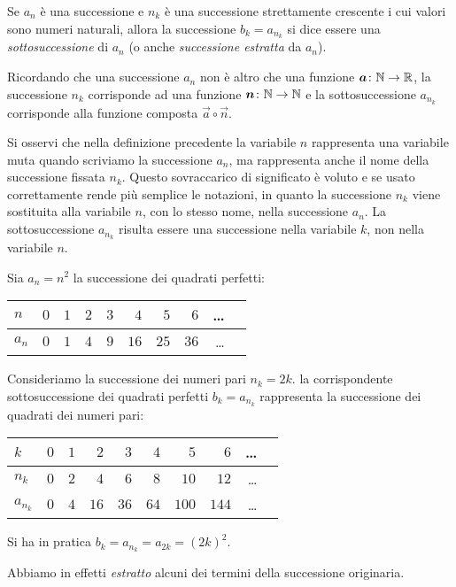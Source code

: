 \begin{definition}[sottosuccessione]
\mymark{*}
Se $a_n$ è una successione e $n_k$ è una successione strettamente crescente i cui valori sono numeri naturali, allora la successione
$b_k = a_{n_k}$ si dice essere una \emph{sottosuccessione}%
%
 di $a_n$
(o anche \emph{successione estratta} da $a_n$).
\end{definition}

Ricordando che una successione $a_n$ non è altro che una funzione
$\boldsymbol a\colon {\mathbb N} \to {\mathbb R}$, la successione $n_k$ corrisponde ad una funzione
$\boldsymbol n\colon {\mathbb N} \to {\mathbb N}$ e la sottosuccessione $a_{n_k}$ corrisponde alla
funzione composta $\vec a \circ \vec n$.

Si osservi che nella definizione precedente la variabile $n$ rappresenta
una variabile muta quando scriviamo la successione $a_n$, ma
rappresenta anche il nome della successione fissata $n_k$.
Questo sovraccarico
di significato è voluto e se usato correttamente rende più semplice
le notazioni, in quanto la successione $n_k$ viene sostituita alla
variabile $n$, con lo stesso nome, nella successione $a_n$.
La sottosuccessione $a_{n_k}$ risulta essere una successione nella variabile $k$, non nella variabile $n$.

\begin{example}
Sia $a_n = n^2$ la successione dei quadrati perfetti:
\begin{center}
\begin{tabular}{l|rrrrrrrrr}
$n$   & $0$ & $1$ & $2$ & $3$ & $4$  & $5$  & $6$  & \dots \\ \hline
$a_n$ & $0$ & $1$ & $4$ & $9$ & $16$ & $25$ & $36$ & \dots
\end{tabular}
\end{center}
Consideriamo la successione dei numeri pari $n_k = 2k$.
la corrispondente sottosuccessione dei quadrati perfetti
$b_k = a_{n_k}$
rappresenta la successione dei quadrati dei numeri pari:
\begin{center}
\begin{tabular}{l|rrrrrrrrr}
$k$       & $0$ & $1$ & $2$ & $3$ & $4$  & $5$  & $6$  & \dots \\ \hline
$n_k$ & $0$ & $2$ & $4$ & $6$ & $8$ & $10$ & $12$ & \dots \\
$a_{n_k}$ & $0$ & $4$ & $16$ & $36$ & $64$ & $100$ & $144$ & \dots
\end{tabular}
\end{center}
Si ha in pratica
  $b_k = a_{n_k} = a_{2k} = (2k)^2$.

Abbiamo in effetti \emph{estratto} alcuni dei termini della successione
originaria.
\end{example}

